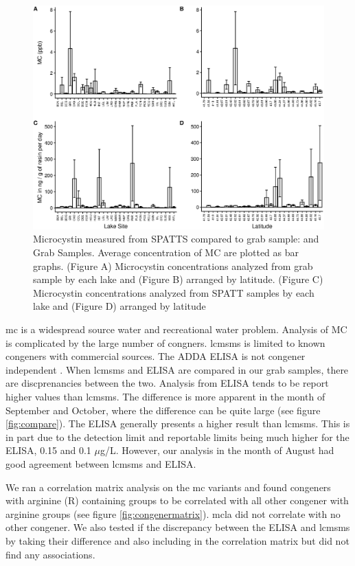 \begin{figure}[p]
\includegraphics[width=\textwidth]{figures/spatttboxplotlake}
\caption{
	Microcystin measured from SPATTS compared to grab sample: and Grab Samples. Average concentration of MC are plotted as bar graphs. (Figure A) Microcystin concentrations analyzed from grab sample by each lake and (Figure B) arranged by latitude. (Figure C) Microcystin concentrations analyzed from SPATT samples by each lake and (Figure D) arranged by latitude
}
\label{fig:spattbox}
\end{figure}



\gls{mc} is a widespread source water and recreational water problem. Analysis of MC is complicated by the large number of congners. \gls{lcmsms} is limited to known congeners with commercial sources. The ADDA ELISA is not congener independent \cite{he_varied_2017}. When \gls{lcmsms} and ELISA are compared in our grab samples, there are discprenancies between the two. Analysis from ELISA tends to be report higher values than \gls{lcmsms}. The difference is more apparent in the month of September and October, where the difference can be quite large (see figure \ref{fig:compare}). The ELISA generally presents a higher result than \gls{lcmsms}. This is in part due to the detection limit and reportable limits being much higher for the ELISA, 0.15 and 0.1 $\mu$g/L. However, our analysis in the month of August had good agreement between \gls{lcmsms} and ELISA. 

We ran a correlation matrix analysis on the \gls{mc} variants and found congeners with arginine (R) containing groups to be correlated with all other congener with arginine groups (see figure \ref{fig:congenermatrix}). \gls{mcla} did not correlate with no other congener. We also tested if the discrepancy between the ELISA and \gls{lcmsms} by taking their difference and also including in the correlation matrix but did not find any associations. 

